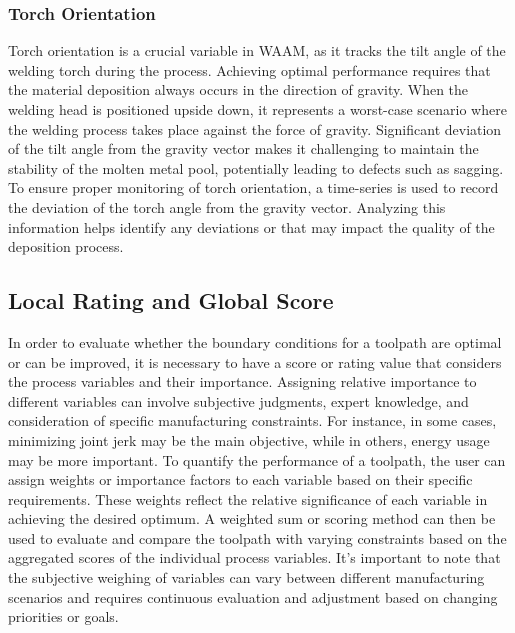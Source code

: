 \documentclass[conference]{IEEEtran}
\begin{document}


\subsubsection*{Torch Orientation}
Torch orientation is a crucial variable in WAAM, as it tracks the tilt angle of the welding torch during the process. Achieving optimal performance requires that the material deposition always occurs in the direction of gravity. When the welding head is positioned upside down, it represents a worst-case scenario where the welding process takes place against the force of gravity. Significant deviation of the tilt angle from the gravity vector makes it challenging to maintain the stability of the molten metal pool, potentially leading to defects such as sagging. To ensure proper monitoring of torch orientation, a time-series is used to record the deviation of the torch angle from the gravity vector. Analyzing this information helps identify any deviations or that may impact the quality of the deposition process.

\subsection{Local Rating and Global Score}\label{LR}
In order to evaluate whether the boundary conditions for a toolpath are optimal or can be improved, it is necessary to have a score or rating value that considers the process variables and their importance. Assigning relative importance to different variables can involve subjective judgments, expert knowledge, and consideration of specific manufacturing constraints. For instance, in some cases, minimizing joint jerk may be the main objective, while in others, energy usage may be more important. To quantify the performance of a toolpath, the user can assign weights or importance factors to each variable based on their specific requirements. These weights reflect the relative significance of each variable in achieving the desired optimum. A weighted sum or scoring method can then be used to evaluate and compare the toolpath with varying constraints based on the aggregated scores of the individual process variables. %
It's important to note that the subjective weighing of variables can vary between different manufacturing scenarios and requires continuous evaluation and adjustment based on changing priorities or goals.
\end{document}
